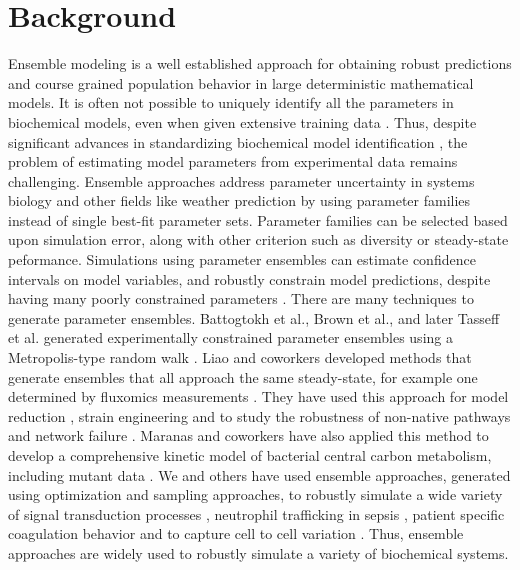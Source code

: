 \documentclass{bmcart}
\begin{document}
\section*{Background}
Ensemble modeling is a well established approach for obtaining robust predictions and course grained population behavior in large deterministic mathematical models.
It is often not possible to uniquely identify all the parameters in biochemical models, even when given extensive training data \cite{Gadkar:2005ad}.
Thus, despite significant advances in standardizing biochemical model identification \cite{Gennemark:2009on},
the problem of estimating model parameters from experimental data remains challenging.
Ensemble approaches address parameter uncertainty in systems biology and other fields like weather prediction \cite{Battogtokh:2002,Kuepfer:2007, Brown:2003,Palmer:2005}
by using parameter families instead of single best-fit parameter sets.
Parameter families can be selected based upon simulation error, along with other criterion such as diversity or steady-state peformance.
Simulations using parameter ensembles can estimate confidence intervals on model variables, and robustly constrain model predictions,
despite having many poorly constrained parameters \cite{Gutenkunst2007,Song:2009b}.
There are many techniques to generate parameter ensembles.
Battogtokh et al., Brown et al., and later Tasseff et al. generated experimentally constrained parameter ensembles using a
Metropolis-type random walk \cite{Battogtokh:2002,Brown:2003,Tasseff:2010aa,Tasseff:2011aa}.
Liao and coworkers developed methods that generate ensembles that all approach the same steady-state, for example one determined by fluxomics measurements \cite{Tran:2008aa}.
They have used this approach for model reduction \cite{Tan:2011aa}, strain engineering \cite{Contador2009221,Tan:2012aa} and to study the robustness of non-native pathways and network failure \cite{Lee:2014aa}. Maranas and coworkers have also applied this method to develop a comprehensive kinetic model of bacterial central carbon metabolism,
including mutant data \cite{Khodayari:2014aa}.
We and others have used ensemble approaches, generated using optimization and sampling approaches, to robustly simulate a wide variety of signal transduction processes \citep{Luan:2007aa,Song:2009aa,Tasseff:2010aa,Tasseff:2011aa,Nayak:2011aa}, neutrophil trafficking in sepsis \cite{Song:2012aa},
patient specific coagulation behavior \cite{Luan:2010aa} and to capture cell to cell variation \cite{Lequieu:2011aa}.
Thus, ensemble approaches are widely used to robustly simulate a variety of biochemical systems.
\end{document}
